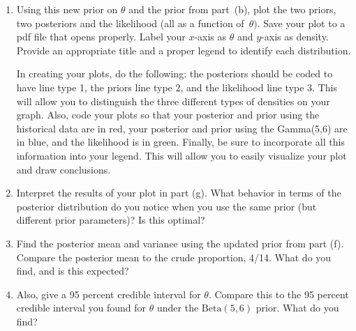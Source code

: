 \documentclass[12pt]{article}
\begin{document}
\begin{enumerate}
\begin{enumerate}
\item Using this new prior on $\theta$ and the prior from part~(b), plot the two priors, two posteriors and the likelihood (all as a function of~$\theta)$. Save your plot to a pdf file that opens properly.
Label your $x$-axis as $\theta$ and $y$-axis as density. Provide an appropriate title and a proper legend to identify each distribution. 

In creating your plots, do the following:
the posteriors should be coded to have line type 1, the priors line type 2, and the likelihood line type 3. This will allow you to distinguish the three different types of densities on your graph. Also, code your plots so that your posterior and prior using the historical data are in red, your posterior and prior using the Gamma(5,6) are in blue, and the likelihood is in green. Finally, be sure to incorporate all this information into your legend. This will allow you to easily visualize your plot and draw conclusions. 

\item Interpret the results of your plot in part (g). What behavior in terms of the posterior distribution do you notice when you use the same prior (but different prior parameters)? Is this optimal?

\item Find the posterior mean and variance using the updated prior from part (f). Compare the posterior mean to the crude proportion, 4/14. What do you find, and is this expected? 


\item Also, give a 95 percent credible interval for $\theta.$ Compare this to the 95 percent credible interval you found for $\theta$ under the $\text{Beta}(5,6)$ prior. What do you find?

%
%
%
%



 
\end{enumerate}
\end{enumerate}
\end{document}
